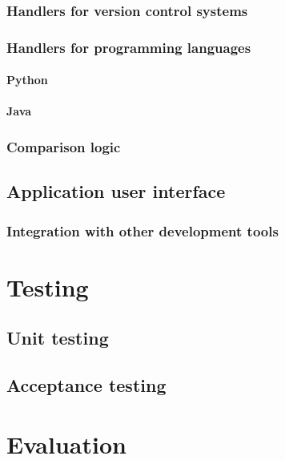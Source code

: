 \documentclass{l4proj}
\begin{document}
\label{VCSHandlers}
\subsection{Handlers for version control systems}

\label{LanguageHandlers}
\subsection{Handlers for programming languages}

\subsubsection{Python}


\subsubsection{Java}

\subsection{Comparison logic}

\section{Application user interface}

\subsection{Integration with other development tools}

\chapter{Testing}

\section{Unit testing}

\section{Acceptance testing}

\chapter{Evaluation}
\end{document}
